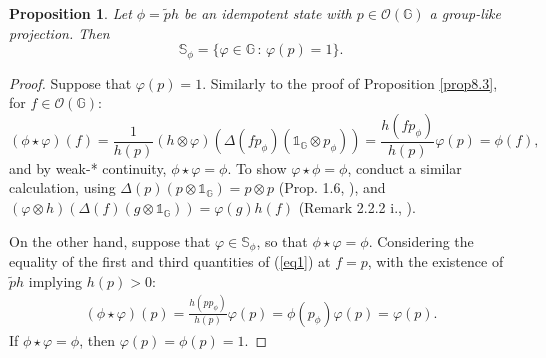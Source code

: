 \documentclass[12pt]{amsart}
\newtheorem{proposition}[theorem]{Proposition}
\theoremstyle{remark}
\theoremstyle{remark}
\begin{document}
\begin{proposition}\label{prop27}
Let $\phi=\widetilde{p}h$ be an idempotent state with $p\in \mathcal{O}(\mathbb{G})$ a group-like projection. Then
  $$\mathbb{S}_\phi=\{\varphi\in\mathbb{G}\,\colon\,\varphi(p)=1\}.$$
\end{proposition}
\begin{proof}
Suppose that $\varphi(p)=1$.
Similarly to the proof of Proposition \ref{prop8.3}, for $f\in \mathcal{O}(\mathbb{G})$:
    \begin{equation}(\phi\star \varphi)(f)=\frac{1}{h(p)}(h\otimes \varphi)(\Delta(fp_{\phi})(\mathds{1}_{\mathbb{G}}\otimes p_{\phi}))=\frac{h(fp_{\phi})}{h(p)}\varphi(p)=\phi(f),\label{eq1}\end{equation}
    and by weak-* continuity, $\phi\star \varphi=\phi$. To show $\varphi\star \phi=\phi$, conduct a similar calculation, using $\Delta(p)(p\otimes \mathds{1}_{\mathbb{G}})=p\otimes p$ (Prop. 1.6, \cite{lvd}), and $(\varphi\otimes h)(\Delta(f)(g\otimes \mathds{1}_{\mathbb{G}}))=\varphi(g)h(f)$ (Remark 2.2.2 i., \cite{tim}).

    \bigskip

     On the other hand, suppose that $\varphi\in \mathbb{S}_\phi$, so that $\phi\star\varphi=\phi$.
Considering the equality of the first and third quantities of (\ref{eq1})  at $f=p$, with the existence of $\widetilde{p}h$ implying $h(p)>0$:
   \begin{align*}
     (\phi\star \varphi)(p)=\frac{h(pp_\phi)}{h(p)}\varphi(p)=\phi(p_\phi)\varphi(p)=\varphi(p).
   \end{align*}
If $\phi\star \varphi=\phi$, then $\varphi(p)=\phi(p)=1$.
   \end{proof}
\end{document}
